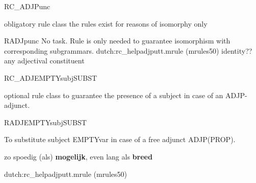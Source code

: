 \begin{mruleclass}{RC\_ADJPunc}
\begin{classdescr}
\kind obligatory rule class
\classtask the rules exist for reasons of isomorphy only
\classremarks

\nofilters

\nospeedrules

\noplannedrules

\norulesnotince


\end{classdescr}

\begin{members}
\begin{member}
 RADJpunc
 No task. Rule is only needed to guarantee
isomorphism with corresponding subgrammars.
\file dutch:rc\_helpadjputt.mrule (mrules50)
\semantics identity??
\example any adjectival constituent
\remarks\mbox{}
\end{member}
\end{members}
\end{mruleclass}

\begin{mruleclass}{RC\_ADJEMPTYsubjSUBST}
\begin{classdescr}
\kind optional rule class
\classtask  to guarantee the presence of a subject in case of an ADJP-adjunct.
\classremarks\mbox{} 
\nofilters

\nospeedrules

\noplannedrules

\norulesnotince


\end{classdescr}
\begin{members}
\begin{member}
 RADJEMPTYsubjSUBST

To substitute subject EMPTYvar in case of a free adjunct 
ADJP(PROP).

\example 
zo spoedig (als) {\bf mogelijk}, even lang als {\bf breed}
 
\file dutch:rc\_helpadjputt.mrule (mrules50)
\semantics 
\remarks\mbox{}

\end{member}
\end{members}
\end{mruleclass}



